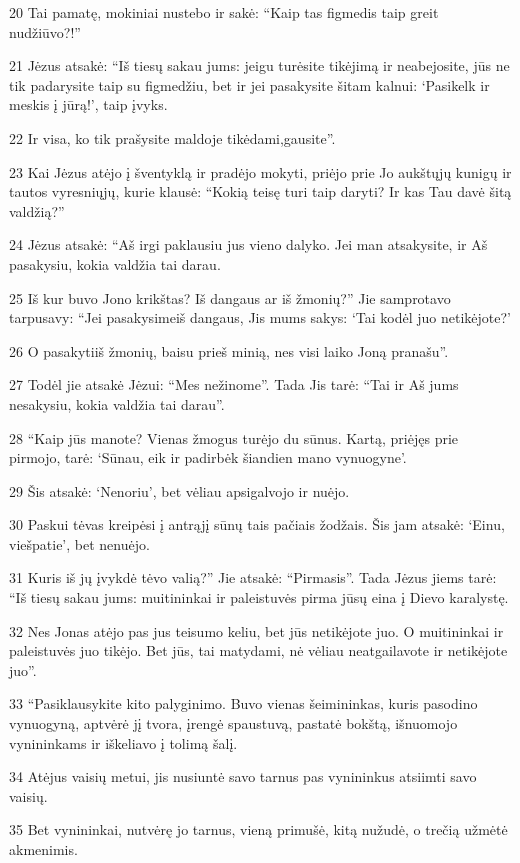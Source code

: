 \par 20 Tai pamatę, mokiniai nustebo ir sakė: “Kaip tas figmedis taip greit nudžiūvo?!” 
\par 21 Jėzus atsakė: “Iš tiesų sakau jums: jeigu turėsite tikėjimą ir neabejosite, jūs ne tik padarysite taip su figmedžiu, bet ir jei pasakysite šitam kalnui: ‘Pasikelk ir meskis į jūrą!’, taip įvyks. 
\par 22 Ir visa, ko tik prašysite maldoje tikėdami,­gausite”. 
\par 23 Kai Jėzus atėjo į šventyklą ir pradėjo mokyti, priėjo prie Jo aukštųjų kunigų ir tautos vyresniųjų, kurie klausė: “Kokią teisę turi taip daryti? Ir kas Tau davė šitą valdžią?” 
\par 24 Jėzus atsakė: “Aš irgi paklausiu jus vieno dalyko. Jei man atsakysite, ir Aš pasakysiu, kokia valdžia tai darau. 
\par 25 Iš kur buvo Jono krikštas? Iš dangaus ar iš žmonių?” Jie samprotavo tarpusavy: “Jei pasakysime­iš dangaus, Jis mums sakys: ‘Tai kodėl juo netikėjote?’ 
\par 26 O pasakyti­iš žmonių, baisu prieš minią, nes visi laiko Joną pranašu”. 
\par 27 Todėl jie atsakė Jėzui: “Mes nežinome”. Tada Jis tarė: “Tai ir Aš jums nesakysiu, kokia valdžia tai darau”. 
\par 28 “Kaip jūs manote? Vienas žmogus turėjo du sūnus. Kartą, priėjęs prie pirmojo, tarė: ‘Sūnau, eik ir padirbėk šiandien mano vynuogyne’. 
\par 29 Šis atsakė: ‘Nenoriu’, bet vėliau apsigalvojo ir nuėjo. 
\par 30 Paskui tėvas kreipėsi į antrąjį sūnų tais pačiais žodžais. Šis jam atsakė: ‘Einu, viešpatie’, bet nenuėjo. 
\par 31 Kuris iš jų įvykdė tėvo valią?” Jie atsakė: “Pirmasis”. Tada Jėzus jiems tarė: “Iš tiesų sakau jums: muitininkai ir paleistuvės pirma jūsų eina į Dievo karalystę. 
\par 32 Nes Jonas atėjo pas jus teisumo keliu, bet jūs netikėjote juo. O muitininkai ir paleistuvės juo tikėjo. Bet jūs, tai matydami, nė vėliau neatgailavote ir netikėjote juo”. 
\par 33 “Pasiklausykite kito palyginimo. Buvo vienas šeimininkas, kuris pasodino vynuogyną, aptvėrė jį tvora, įrengė spaustuvą, pastatė bokštą, išnuomojo vynininkams ir iškeliavo į tolimą šalį. 
\par 34 Atėjus vaisių metui, jis nusiuntė savo tarnus pas vynininkus atsiimti savo vaisių. 
\par 35 Bet vynininkai, nutvėrę jo tarnus, vieną primušė, kitą nužudė, o trečią užmėtė akmenimis. 

